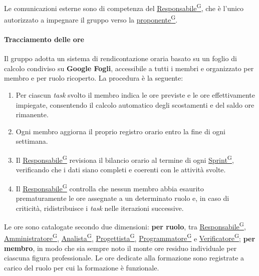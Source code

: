 \documentclass[a4paper,12pt]{article}
\providecommand{\glslink}[2]{\href{https://alittlebyte-19.github.io/Documentazione/glossario.html\#gls-#1}{\underline{#2}\textsuperscript{\scriptsize G}}}
\begin{document}
Le comunicazioni esterne sono di competenza del \glslink{responsabile}{Responsabile}, che è l'unico autorizzato a impegnare il gruppo verso la \glslink{committente-proponente}{proponente}.

\paragraph{Tracciamento delle ore}
Il gruppo adotta un sistema di rendicontazione oraria basato su un foglio di calcolo condiviso su \textbf{Google Fogli}, accessibile a tutti i membri e organizzato per membro e per ruolo ricoperto. La procedura è la seguente:

\begin{enumerate}
    \item Per ciascun \textit{task} svolto il membro indica le ore previste e le ore effettivamente impiegate, consentendo il calcolo automatico degli scostamenti e del saldo ore rimanente.
    \item Ogni membro aggiorna il proprio registro orario entro la fine di ogni settimana.
    \item Il \glslink{responsabile}{Responsabile} revisiona il bilancio orario al termine di ogni \glslink{sprint}{Sprint}, verificando che i dati siano completi e coerenti con le attività svolte.
    \item Il \glslink{responsabile}{Responsabile} controlla che nessun membro abbia esaurito prematuramente le ore assegnate a un determinato ruolo e, in caso di criticità, ridistribuisce i \textit{task} nelle iterazioni successive.
\end{enumerate}

Le ore sono catalogate secondo due dimensioni: \textbf{per ruolo}, tra \glslink{responsabile}{Responsabile}, \glslink{amministratore}{Amministratore}, \glslink{analista}{Analista}, \glslink{progettista}{Progettista}, \glslink{programmatore}{Programmatore} e \glslink{verificatore}{Verificatore}; \textbf{per membro}, in modo che sia sempre noto il monte ore residuo individuale per ciascuna figura professionale. Le ore dedicate alla formazione sono registrate a carico del ruolo per cui la formazione è funzionale.
\end{document}
